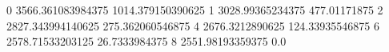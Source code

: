 0 3566.361083984375 1014.379150390625
1 3028.99365234375 477.01171875
2 2827.343994140625 275.362060546875
4 2676.3212890625 124.33935546875
6 2578.71533203125 26.7333984375
8 2551.98193359375 0.0
